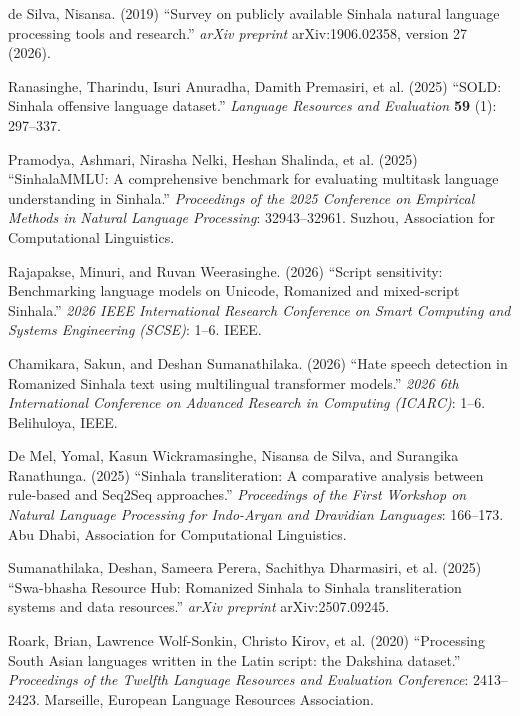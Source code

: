 
de Silva, Nisansa. (2019) ``Survey on publicly available Sinhala natural language processing tools and research.'' {\it arXiv preprint} arXiv:1906.02358, version 27 (2026).

Ranasinghe, Tharindu, Isuri Anuradha, Damith Premasiri, et al. (2025) ``SOLD: Sinhala offensive language dataset.'' {\it Language Resources and Evaluation} {\bf 59} (1): 297--337.

Pramodya, Ashmari, Nirasha Nelki, Heshan Shalinda, et al. (2025) ``SinhalaMMLU: A comprehensive benchmark for evaluating multitask language understanding in Sinhala.'' {\it Proceedings of the 2025 Conference on Empirical Methods in Natural Language Processing}: 32943--32961. Suzhou, Association for Computational Linguistics.

Rajapakse, Minuri, and Ruvan Weerasinghe. (2026) ``Script sensitivity: Benchmarking language models on Unicode, Romanized and mixed-script Sinhala.'' {\it 2026 IEEE International Research Conference on Smart Computing and Systems Engineering (SCSE)}: 1--6. IEEE.

Chamikara, Sakun, and Deshan Sumanathilaka. (2026) ``Hate speech detection in Romanized Sinhala text using multilingual transformer models.'' {\it 2026 6th International Conference on Advanced Research in Computing (ICARC)}: 1--6. Belihuloya, IEEE.

De Mel, Yomal, Kasun Wickramasinghe, Nisansa de Silva, and Surangika Ranathunga. (2025) ``Sinhala transliteration: A comparative analysis between rule-based and Seq2Seq approaches.'' {\it Proceedings of the First Workshop on Natural Language Processing for Indo-Aryan and Dravidian Languages}: 166--173. Abu Dhabi, Association for Computational Linguistics.

Sumanathilaka, Deshan, Sameera Perera, Sachithya Dharmasiri, et al. (2025) ``Swa-bhasha Resource Hub: Romanized Sinhala to Sinhala transliteration systems and data resources.'' {\it arXiv preprint} arXiv:2507.09245.

Roark, Brian, Lawrence Wolf-Sonkin, Christo Kirov, et al. (2020) ``Processing South Asian languages written in the Latin script: the Dakshina dataset.'' {\it Proceedings of the Twelfth Language Resources and Evaluation Conference}: 2413--2423. Marseille, European Language Resources Association.

